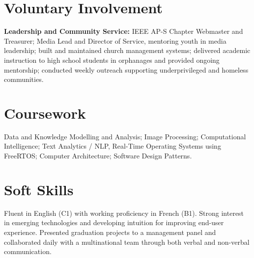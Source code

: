 \documentclass[letterpaper,11pt]{article}
\begin{document}
\section{Voluntary Involvement}
\textbf{Leadership and Community Service:} IEEE AP-S Chapter Webmaster and Treasurer; Media Lead and Director of Service, mentoring youth in media leadership; built and maintained church management systems; delivered academic instruction to high school students in orphanages and provided ongoing mentorship; conducted weekly outreach supporting underprivileged and homeless communities.


\section{Coursework}
Data and Knowledge Modelling and Analysis; Image Processing; Computational Intelligence; Text Analytics / NLP, Real-Time Operating Systems using FreeRTOS; Computer Architecture; Software Design Patterns.


\section{Soft Skills}
Fluent in English (C1) with working proficiency in French (B1). Strong interest in emerging technologies and developing intuition for improving end-user experience. Presented graduation projects to a management panel and collaborated daily with a multinational team through both verbal and non-verbal communication.
\end{document}
